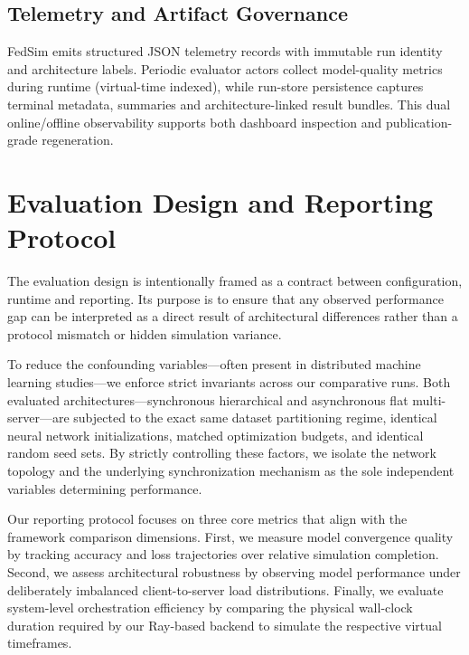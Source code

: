 \documentclass[conference]{IEEEtran}
\begin{document}
\subsection{Telemetry and Artifact Governance}
FedSim emits structured JSON telemetry records with immutable run identity and architecture labels. Periodic evaluator actors collect model-quality metrics during runtime (virtual-time indexed), while run-store persistence captures terminal metadata, summaries and architecture-linked result bundles. This dual online/offline observability supports both dashboard inspection and publication-grade regeneration.

\section{Evaluation Design and Reporting Protocol}
\label{sec:evaldesign}
The evaluation design is intentionally framed as a contract between configuration, runtime and reporting. Its purpose is to ensure that any observed performance gap can be interpreted as a direct result of architectural differences rather than a protocol mismatch or hidden simulation variance. 

To reduce the confounding variables—often present in distributed machine learning studies—we enforce strict invariants across our comparative runs. Both evaluated architectures—synchronous hierarchical and asynchronous flat multi-server—are subjected to the exact same dataset partitioning regime, identical neural network initializations, matched optimization budgets, and identical random seed sets. By strictly controlling these factors, we isolate the network topology and the underlying synchronization mechanism as the sole independent variables determining performance.

Our reporting protocol focuses on three core metrics that align with the framework comparison dimensions. First, we measure model convergence quality by tracking accuracy and loss trajectories over relative simulation completion. Second, we assess architectural robustness by observing model performance under deliberately imbalanced client-to-server load distributions. Finally, we evaluate system-level orchestration efficiency by comparing the physical wall-clock duration required by our Ray-based backend to simulate the respective virtual timeframes.
\end{document}

